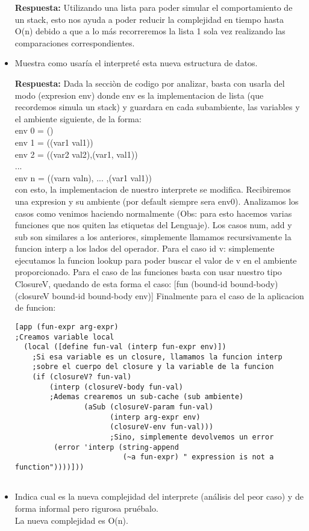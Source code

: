 \documentclass[letterpaper,11pt]{article}
\begin{document}
\begin{itemize}
  \textbf{Respuesta: }
    Utilizando una lista para poder simular el comportamiento de un stack, esto nos ayuda a poder reducir la complejidad en tiempo hasta O(n)
    debido a que a lo más recorreremos la lista 1 sola vez realizando las comparaciones correspondientes.
 \item Muestra como usaría el interpreté esta nueva estructura de datos.
 
  \textbf{Respuesta: }
    Dada la secciòn de codigo por analizar, basta con usarla del modo (expresion env) donde env es la implementacion de lista (que recordemos simula un stack) y guardara en cada
    subambiente, las variables y el ambiente siguiente, de la forma: 
    \\
    env 0 = ()
    \\
    env 1 = ((var1 val1))
    \\
    env 2 = ((var2 val2),(var1, val1))
    \\
    ...
    \\
    env n = ((varn valn), ... ,(var1 val1))  
    \\
    con esto, la implementacion de nuestro interprete se modifica. Recibiremos una expresion y su ambiente (por default siempre sera env0). Analizamos los casos como venimos haciendo normalmente
    (Obs: para esto hacemos varias funciones que nos quiten las etiquetas del Lenguaje). Los casos num, add y sub son similares a los anteriores, simplemente llamamos recursivamente la funcion interp
    a los lados del operador.
    Para el caso id v: simplemente ejecutamos la funcion lookup para poder buscar el valor de v en el ambiente proporcionado.
    Para el caso de las funciones basta con usar nuestro tipo ClosureV, quedando de esta forma el caso:    [fun (bound-id bound-body) (closureV bound-id bound-body env)]
    Finalmente para el caso de la aplicacion de funcion:
    \begin{verbatim} 
[app (fun-expr arg-expr)
;Creamos variable local
  (local ([define fun-val (interp fun-expr env)])
    ;Si esa variable es un closure, llamamos la funcion interp 
    ;sobre el cuerpo del closure y la variable de la funcion
    (if (closureV? fun-val)
        (interp (closureV-body fun-val)
        ;Ademas crearemos un sub-cache (sub ambiente)
                (aSub (closureV-param fun-val)
                      (interp arg-expr env)
                      (closureV-env fun-val)))
                      ;Sino, simplemente devolvemos un error
         (error 'interp (string-append 
                         (~a fun-expr) " expression is not a function"))))]))   
    
     \end{verbatim}
    
 
 \item Indica cual es la nueva complejidad del interprete (análisis del peor caso) y de forma informal pero rigurosa pruébalo.
  \\
  La nueva complejidad es O(n).
  
 
 
 
 \end{itemize}
 
\end{document}
